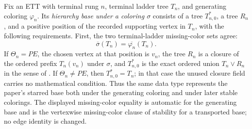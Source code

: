 \begin{definition}
Fix an ETT with terminal rung $n$, terminal ladder tree $T_n$, and
generating coloring $\varphi_n$.  Its \emph{hierarchy base under a
coloring $\sigma$} consists of a tree $T_{n,0}^{*}$, a tree $R_n$, and
a positive position of the recorded supporting vertex in $T_n$, with
the following requirements.  First, the two terminal-ladder
missing-color sets agree:
\[
             \overline\sigma(T_n)=\overline{\varphi_n}(T_n).
\]
If $\Theta_n=PE$, the chosen vertex at that position is $v_n$, the tree
$R_n$ is a closure of the ordered prefix $T_n(v_n)$ under $\sigma$, and
$T_{n,0}^{*}$ is the exact ordered union $T_n\vee R_n$ in the sense of
.  If $\Theta_n\ne PE$, then
$T_{n,0}^{*}=T_n$; in that case the unused closure field carries no
mathematical condition.  Thus the same data type represents the paper's
starred base both under the generating coloring and under later stable
colorings.  The displayed missing-color equality is automatic for the
generating base and is the vertexwise missing-color clause of stability
for a transported base; no edge identity is changed.
\end{definition}
